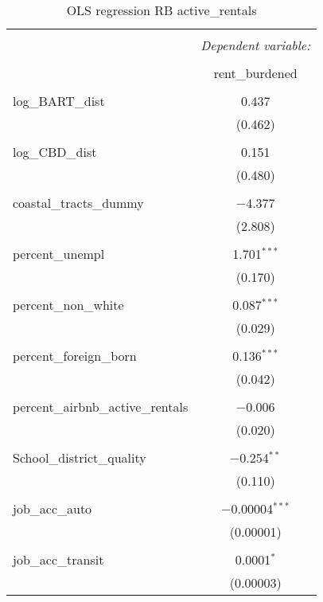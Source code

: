 \documentclass[10pt, letterpaper]{amsart}
\begin{document}
\begin{table}[H] \centering 
  \caption{ OLS regression RB active\_rentals} 
  \label{}
  \begin{tabular}{@{\extracolsep{5pt}}lc} 
    \\[-1.8ex]\hline 
    \hline \\[-1.8ex] 
    & \multicolumn{1}{c}{\textit{Dependent variable:}} \\ 
    \cline{2-2} 
    \\[-1.8ex] & rent\_burdened \\ 
    \hline \\[-1.8ex] 
    log\_BART\_dist & 0.437 \\ 
    & (0.462) \\ 
    & \\ 
    log\_CBD\_dist & 0.151 \\ 
    & (0.480) \\ 
    & \\ 
    coastal\_tracts\_dummy & $-$4.377 \\ 
    & (2.808) \\ 
    & \\ 
    percent\_unempl & 1.701$^{***}$ \\ 
    & (0.170) \\ 
    & \\ 
    percent\_non\_white & 0.087$^{***}$ \\ 
    & (0.029) \\ 
    & \\ 
    percent\_foreign\_born & 0.136$^{***}$ \\ 
    & (0.042) \\ 
    & \\ 
    percent\_airbnb\_active\_rentals & $-$0.006 \\ 
    & (0.020) \\ 
    & \\ 
    School\_district\_quality & $-$0.254$^{**}$ \\ 
    & (0.110) \\ 
    & \\ 
    job\_acc\_auto & $-$0.00004$^{***}$ \\ 
    & (0.00001) \\ 
    & \\ 
    job\_acc\_transit & 0.0001$^{*}$ \\ 
    & (0.00003) \\ 

\end{tabular}
\end{table}
\end{document}
